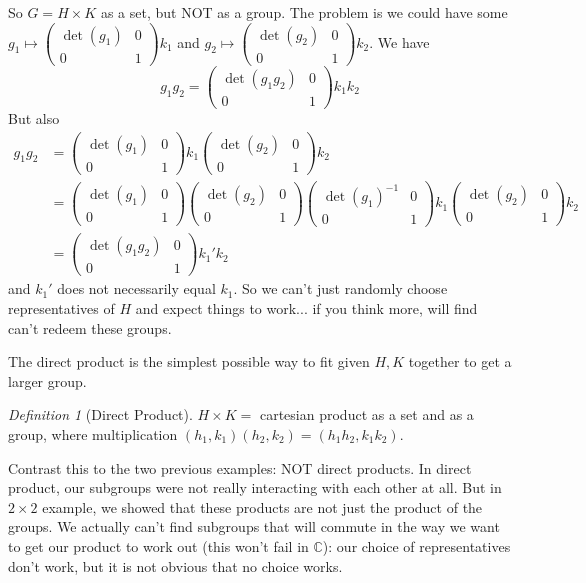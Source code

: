 \documentclass{article}
\theoremstyle{plain}
\theoremstyle{remark}
\newtheorem{definition}{Definition}
\newcommand{\C}{{\mathbb C}}
\begin{document}
So $G = H \times K$ as a set, but NOT as a group.
The problem is we could have some
$g_1 \mapsto \begin{pmatrix} \det(g_1) &0 \\ 0 & 1\end{pmatrix}k_1$
and $g_2 \mapsto \begin{pmatrix} \det(g_2) &0 \\ 0 & 1\end{pmatrix}k_2$.
We have
\[
	g_1g_2 = \begin{pmatrix} \det(g_1g_2)&0 \\ 0 & 1\end{pmatrix} k_1k_2
\]
But also
\begin{align*}
	g_1g_2
	&= \begin{pmatrix} \det(g_1) & 0 \\ 0 & 1\end{pmatrix} k_1
	\begin{pmatrix} \det(g_2) & 0 \\ 0 & 1\end{pmatrix} k_2\\
	&= \begin{pmatrix} \det(g_1) & 0 \\ 0 & 1\end{pmatrix}
	\begin{pmatrix} \det(g_2) & 0 \\ 0 & 1\end{pmatrix}
	\begin{pmatrix} \det(g_1)^{-1} & 0 \\ 0 & 1\end{pmatrix}k_1
	\begin{pmatrix} \det(g_2) & 0 \\ 0 & 1\end{pmatrix}k_2\\
	&= \begin{pmatrix} \det(g_1g_2) & 0 \\ 0 & 1\end{pmatrix} k_1'k_2
\end{align*}
and $k_1'$ does not necessarily equal $k_1$.
So we can't just randomly choose representatives of $H$ and expect
things to work... if you think more, will find can't redeem these groups.

The direct product is the simplest possible way to fit given $H,K$
together to get a larger group.
\begin{definition}[Direct Product]
	$H \times K =$ cartesian  product as a set and as a group,
	where multiplication $(h_1,k_1)(h_2,k_2) = (h_1h_2,k_1k_2)$.
\end{definition}
Contrast this to the two previous examples: NOT direct products.
In direct product, our subgroups were not really interacting with each other at all.
But in $2 \times 2$ example, we showed that these products
are not just the product of the groups.
We actually can't find subgroups that will commute in the way we want
to get our product to work out (this won't fail in $\C$):
our choice of representatives don't work, but it is not obvious
that no choice works.
\end{document}

